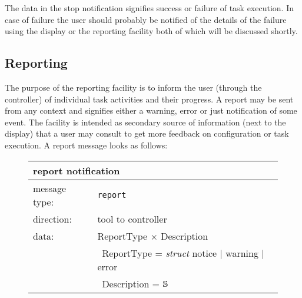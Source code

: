 \documentclass{article}
\newcommand{\msg}[1]{\texttt{#1}}
\newcommand{\String}{\ensuremath \mathbb{S}\xspace}
\begin{document}
   \noindent The data in the stop notification signifies success or failure
   of task execution. In case of failure the user should probably be notified
   of the details of the failure using the display or the reporting facility
   both of which will be discussed shortly.

  \pagebreak
  \subsection{Reporting}

   The purpose of the reporting facility is to inform the user (through the
   controller) of individual task activities and their progress. A report may
   be sent from any context and signifies either a warning, error or just
   notification of some event. The facility is intended as secondary source of
   information (next to the display) that a user may consult to get more
   feedback on configuration or task execution. A report message looks as follows:

   \begin{figure}[H]
    \begin{center}
     \begin{tabular}{|ll|}
      \hline
       \multicolumn{2}{|l|}{\textbf{report notification}} \\
      \hline
       message type:   & \msg{report} \\
      \hline
       direction:      & tool to controller \\
      \hline
       data:           & ReportType $\times$ Description \\
                       & \ ReportType = \textit{struct} notice $|$ warning $|$ error \\
                       & \ Description = $\String$ \\
      \hline
     \end{tabular}
    \end{center}
   \end{figure}
   \vspace{-0.3cm}
\end{document}
